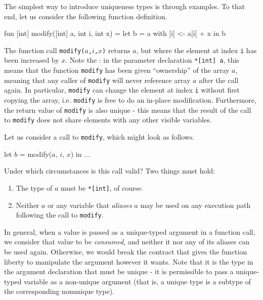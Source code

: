 The simplest way to introduce uniqueness types is through examples.
To that end, let us consider the following function definition.

\begin{colorcode}
fun \emp{*}[int] modify(\emp{*}[int] a, int i, int x) =
  let b = a with [i] <- a[i] + x in
  b
\end{colorcode}

The function call \texttt{modify($a$,$i$,$x$)} returns $a$, but where
the element at index \texttt{i} has been increased by $x$.  Note the
: in the parameter declaration \texttt{*[int] a}, this
means that the function \texttt{modify} has been given ``ownership''
of the array $a$, meaning that any caller of \texttt{modify} will
never reference array $a$ after the call again.  In particular,
\texttt{modify} can change the element at index \texttt{i} without
first copying the array, i.e. \texttt{modify} is free to do an
in-place modification.  Furthermore, the return value of
\texttt{modify} is also unique - this means that the result of the
call to \texttt{modify} does not share elements with any other visible
variables.

Let us consider a call to \texttt{modify}, which might look as
follows.

\begin{colorcode}
let \(b\) = modify(\(a\), \(i\), \(x\)) in
...
\end{colorcode}

Under which circumstances is this call valid?  Two things must hold:
\begin{enumerate}
\item The type of \texttt{$a$} must be \texttt{*[int]}, of course.

\item Neither \texttt{$a$} or any variable that \textit{aliases}
  \texttt{$a$} may be used on any execution path following the call to
  \texttt{modify}.
\end{enumerate}

In general, when a value is passed as a unique-typed argument in a
function call, we consider that value to be \textit{consumed}, and
neither it nor any of its aliases can be used again.  Otherwise, we
would break the contract that gives the function liberty to manipulate
the argument however it wants.  Note that it is the type in the
argument declaration that must be unique - it is permissible to pass a
unique-typed variable as a non-unique argument (that is, a unique type
is a subtype of the corresponding nonunique type).

